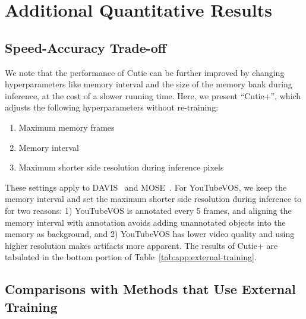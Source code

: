 \clearpage
\section{Additional Quantitative Results}\label{sec:app:quantitative}

\subsection{Speed-Accuracy Trade-off}
We note that the performance of Cutie can be further improved by changing hyperparameters like memory interval and the size of the memory bank during inference, at the cost of a slower running time.
Here, we present ``Cutie+'', which adjusts the following hyperparameters without re-training:
\begin{enumerate}
    \item Maximum memory frames 
    \item Memory interval 
    \item Maximum shorter side resolution during inference  pixels
\end{enumerate}
These settings apply to DAVIS~\cite{perazzi2016benchmark} and MOSE~\cite{ding2023mose}. 
For YouTubeVOS, we keep the memory interval  and set the maximum shorter side resolution during inference to  for two reasons: 1) YouTubeVOS is annotated every 5 frames, and aligning the memory interval with annotation avoids adding unannotated objects into the memory as background, and 2) YouTubeVOS has lower video quality and using higher resolution makes artifacts more apparent.
The results of Cutie+ are tabulated in the bottom portion of Table~\ref{tab:app:external-training}. 

\subsection{Comparisons with Methods that Use External Training}

